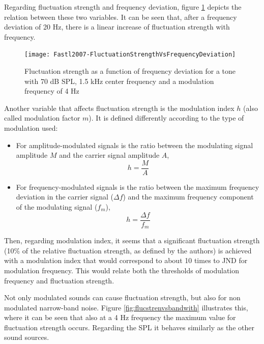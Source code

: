 Regarding fluctuation strength and frequency deviation, figure
\ref{fig:flucstrenvsfreqdev} depicts the relation between these two variables.
It can be seen that, after a frequency deviation of 20 Hz, there is a linear
increase of fluctuation strength with frequency.

\begin{figure}
    \centering
    \texttt{[image: Fastl2007-FluctuationStrengthVsFrequencyDeviation]}
    \caption{Fluctuation strength as a function of frequency deviation for a
        tone with 70 dB SPL, 1.5 kHz center frequency and a modulation frequency
        of 4 Hz \cite[pp. 251]{Fastl2007Psychoacoustics}}
    \label{fig:flucstrenvsfreqdev}
\end{figure}

Another variable that affects fluctuation strength is the modulation index $h$
(also called modulation factor $m$). It is defined differently according to the
type of modulation used:
\begin{itemize}
    \item For amplitude-modulated signals is the ratio between the modulating
        signal amplitude $M$ and the carrier signal amplitude $A$,
        \begin{equation}
            h=\frac{M}{A}
        \end{equation}
    \item For frequency-modulated signals is the ratio between the maximum
        frequency deviation in the carrier signal ($\Delta f$) and the maximum
        frequency component of the modulating signal ($f_m$),
        \begin{equation}
            h=\frac{\Delta f}{f_m}
        \end{equation}
\end{itemize}

Then, regarding modulation index, it seems that a significant fluctuation
strength (10\% of the relative fluctuation strength, as defined by the authors)
is achieved with a modulation index that would correspond to about 10 times to
JND for modulation frequency. This would relate both the thresholds of
modulation frequency and fluctuation strength.

Not only modulated sounds can cause fluctuation strength, but also for non
modulated narrow-band noise. Figure \ref{fig:flucstrenvsbandwith} illustrates
this, where it can be seen that also at a 4 Hz frequency the maximum value for
fluctuation strength occurs. Regarding the SPL it behaves similarly as the other
sound sources.


